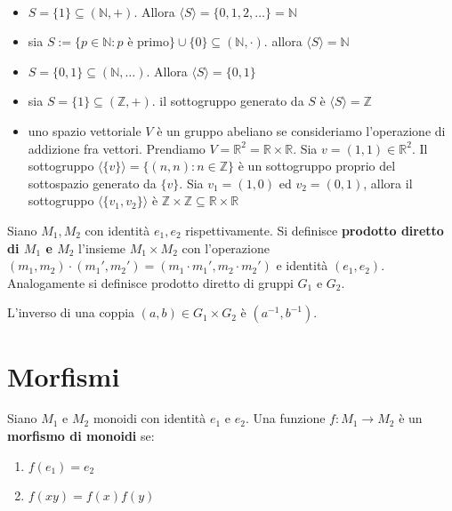 \documentclass[../main.tex]{subfiles}
\begin{document}
\begin{example}
    \
    \begin{itemize}
        \item $S = \{1\} \subseteq  (\mathbb{N}, +)$. Allora $\langle S \rangle = \{0,1,2,\ldots\} = \mathbb{N}$
        \item sia $S:= \{p \in \mathbb{N} : p \text{ è primo}\} \cup \{0\} \subseteq (\mathbb{N}, \cdot)$.
              allora $\langle S \rangle = \mathbb{N}$
        \item $S = \{0,1\} \subseteq (\mathbb{N} , \ldots)$. Allora $\langle S \rangle = \{0,1\}$
        \item sia $S = \{1\} \subseteq  (\mathbb{Z}, +)$. il sottogruppo generato da $S$ è $\langle S \rangle
                  = \mathbb{Z}$
        \item uno spazio vettoriale $V$ è un gruppo abeliano se consideriamo l'operazione di addizione fra vettori.
              Prendiamo $V=\mathbb{R}^2 = \mathbb{R} \times \mathbb{R}$. Sia $v = (1,1) \in \mathbb{R}^2$.
              Il sottogruppo $\langle \{v\} \rangle = \{(n,n): n \in \mathbb{Z}\}$ è un sottogruppo proprio del
              sottospazio generato da $\{v\}$. Sia $v_1 = (1,0)$ ed $v_2 = (0,1)$, allora il sottogruppo
              $\langle \{v_1,v_2\} \rangle$ è $\mathbb{Z} \times \mathbb{Z} \subseteq  \mathbb{R} \times \mathbb{R}$
    \end{itemize}
\end{example}

\begin{definition}
    Siano $M_1 , M_2$ con identità $e_1 , e_2$ rispettivamente. Si definisce \textbf{prodotto diretto di $M_1$ e $M_2$} l'insieme $M_1 \times M_2$ con l'operazione $(m_1,m_2) \cdot (m_1',m_2') = (m_1 \cdot m_1', m_2 \cdot m_2')$ e identità $(e_1,e_2)$.
    Analogamente si definisce prodotto diretto di gruppi $G_1$ e $G_2$.
\end{definition}

L'inverso di una coppia $(a,b) \in G_1 \times G_2$ è $(a^{-1},b^{-1})$.

\section{Morfismi}
\begin{definition}
    Siano $M_1$ e $M_2$ monoidi con identità $e_1$ e $e_2$. Una funzione $f : M_1 \rightarrow M_2$ è un \textbf{morfismo di monoidi} se:
    \begin{enumerate}[label=(\roman*)]
        \item $f(e_1) = e_2$
        \item $f(xy) = f(x)f(y)$
    \end{enumerate}
\end{definition}
\end{document}
